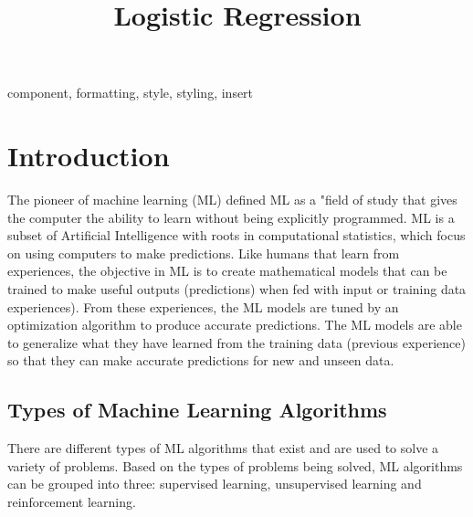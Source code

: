 \documentclass[conference]{IEEEtran}
\begin{document}
\title{Logistic Regression\\
}

\author{
}

\maketitle

\begin{abstract}

\end{abstract}

\begin{IEEEkeywords}
component, formatting, style, styling, insert
\end{IEEEkeywords}

\section{Introduction}
The pioneer of machine learning (ML) defined ML as a "field of study that gives the computer the ability to learn without being explicitly programmed\cite{bb1}. ML is a subset of Artificial Intelligence with roots in computational statistics, which focus on using computers to make predictions. Like humans that learn from experiences, the objective in ML is to create mathematical models that can be trained to make useful outputs (predictions) when fed with input or training data experiences). From these experiences, the ML models are tuned by an optimization
algorithm to produce accurate predictions. The ML models are able to generalize what they have learned from the training data (previous experience) so that they can make accurate predictions for new and unseen data\cite{bb2}.

\subsection{Types of Machine Learning Algorithms}
There are different types of ML algorithms that exist and are used to solve a variety of problems. Based on the types of problems being solved, ML algorithms can be grouped into three: supervised learning, unsupervised learning and reinforcement learning.
\end{document}
